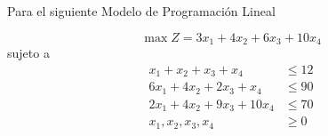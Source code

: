 \documentclass[../main.tex]{subfiles}
\begin{document}

\begin{questions}










\question
Para el siguiente Modelo de Programación Lineal

\[\max  Z = 3x_1 + 4x_2 + 6x_3 + 10x_4\]
sujeto a
\begin{align*}
  x_1 + x_2 + x_3 + x_4 & \leq 12 \\
  6x_1 + 4x_2 + 2x_3 + x_4 & \leq 90 \\
  2x_1 + 4x_2 + 9x_3 + 10x_4 & \leq 70 \\[5mm]
  x_1, x_2, x_3, x_4 & \geq 0
\end{align*}


\end{questions}
\end{document}
